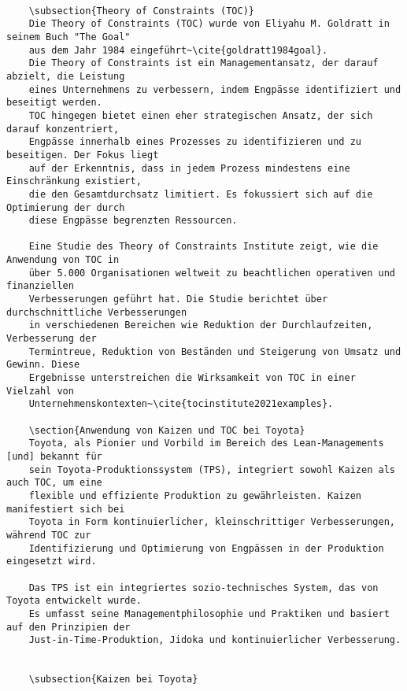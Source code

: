 \begin{verbatim}
	
	\subsection{Theory of Constraints (TOC)}
	Die Theory of Constraints (TOC) wurde von Eliyahu M. Goldratt in seinem Buch "The Goal"
	aus dem Jahr 1984 eingeführt~\cite{goldratt1984goal}.
	Die Theory of Constraints ist ein Managementansatz, der darauf abzielt, die Leistung
	eines Unternehmens zu verbessern, indem Engpässe identifiziert und beseitigt werden.
	TOC hingegen bietet einen eher strategischen Ansatz, der sich darauf konzentriert,
	Engpässe innerhalb eines Prozesses zu identifizieren und zu beseitigen. Der Fokus liegt
	auf der Erkenntnis, dass in jedem Prozess mindestens eine Einschränkung existiert,
	die den Gesamtdurchsatz limitiert. Es fokussiert sich auf die Optimierung der durch
	diese Engpässe begrenzten Ressourcen.
	
	Eine Studie des Theory of Constraints Institute zeigt, wie die Anwendung von TOC in
	über 5.000 Organisationen weltweit zu beachtlichen operativen und finanziellen
	Verbesserungen geführt hat. Die Studie berichtet über durchschnittliche Verbesserungen
	in verschiedenen Bereichen wie Reduktion der Durchlaufzeiten, Verbesserung der
	Termintreue, Reduktion von Beständen und Steigerung von Umsatz und Gewinn. Diese
	Ergebnisse unterstreichen die Wirksamkeit von TOC in einer Vielzahl von
	Unternehmenskontexten~\cite{tocinstitute2021examples}.
	
	\section{Anwendung von Kaizen und TOC bei Toyota}
	Toyota, als Pionier und Vorbild im Bereich des Lean-Managements [und] bekannt für 
	sein Toyota-Produktionssystem (TPS), integriert sowohl Kaizen als auch TOC, um eine 
	flexible und effiziente Produktion zu gewährleisten. Kaizen manifestiert sich bei 
	Toyota in Form kontinuierlicher, kleinschrittiger Verbesserungen, während TOC zur 
	Identifizierung und Optimierung von Engpässen in der Produktion eingesetzt wird. 
	
	Das TPS ist ein integriertes sozio-technisches System, das von Toyota entwickelt wurde.
	Es umfasst seine Managementphilosophie und Praktiken und basiert auf den Prinzipien der
	Just-in-Time-Produktion, Jidoka und kontinuierlicher Verbesserung.
	
	
	\subsection{Kaizen bei Toyota}
	

\end{verbatim}

